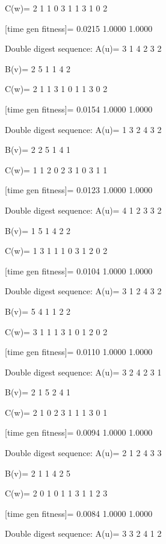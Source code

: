 C(w)=
     2     1     1     0     3     1     1     3     1     0     2

[time gen fitness]=
    0.0215    1.0000    1.0000

Double digest sequence:
A(u)=
     3     1     4     2     3     2

B(v)=
     2     5     1     1     4     2

C(w)=
     2     1     1     3     1     0     1     1     3     0     2

[time gen fitness]=
    0.0154    1.0000    1.0000

Double digest sequence:
A(u)=
     1     3     2     4     3     2

B(v)=
     2     2     5     1     4     1

C(w)=
     1     1     2     0     2     3     1     0     3     1     1

[time gen fitness]=
    0.0123    1.0000    1.0000

Double digest sequence:
A(u)=
     4     1     2     3     3     2

B(v)=
     1     5     1     4     2     2

C(w)=
     1     3     1     1     1     0     3     1     2     0     2

[time gen fitness]=
    0.0104    1.0000    1.0000

Double digest sequence:
A(u)=
     3     1     2     4     3     2

B(v)=
     5     4     1     1     2     2

C(w)=
     3     1     1     1     3     1     0     1     2     0     2

[time gen fitness]=
    0.0110    1.0000    1.0000

Double digest sequence:
A(u)=
     3     2     4     2     3     1

B(v)=
     2     1     5     2     4     1

C(w)=
     2     1     0     2     3     1     1     1     3     0     1

[time gen fitness]=
    0.0094    1.0000    1.0000

Double digest sequence:
A(u)=
     2     1     2     4     3     3

B(v)=
     2     1     1     4     2     5

C(w)=
     2     0     1     0     1     1     3     1     1     2     3

[time gen fitness]=
    0.0084    1.0000    1.0000

Double digest sequence:
A(u)=
     3     3     2     4     1     2

